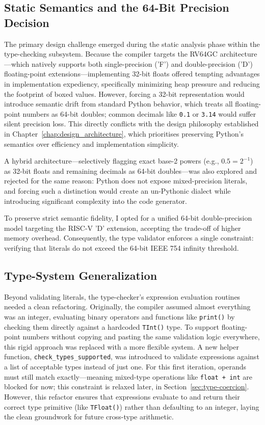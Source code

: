 \subsection{Static Semantics and the 64-Bit Precision Decision}
The primary design challenge emerged during the static analysis phase within the type-checking subsystem. Because the compiler targets the RV64GC architecture—which natively supports both single-precision ('F') and double-precision ('D') floating-point extensions—implementing 32-bit floats offered tempting advantages in implementation expediency, specifically minimizing heap pressure and reducing the footprint of boxed values. However, forcing a 32-bit representation would introduce semantic drift from standard Python behavior, which treats all floating-point numbers as 64-bit doubles; common decimals like \texttt{0.1} or \texttt{3.14} would suffer silent precision loss. This directly conflicts with the design philosophy established in Chapter~\ref{chap:design_architecture}, which prioritises preserving Python's semantics over efficiency and implementation simplicity.

A hybrid architecture—selectively flagging exact base-2 powers (e.g., $0.5 = 2^{-1}$) as 32-bit floats and remaining decimals as 64-bit doubles—was also explored and rejected for the same reason: Python does not expose mixed-precision literals, and forcing such a distinction would create an un-Pythonic dialect while introducing significant complexity into the code generator.

To preserve strict semantic fidelity, I opted for a unified 64-bit double-precision model targeting the RISC-V 'D' extension, accepting the trade-off of higher memory overhead. Consequently, the type validator enforces a single constraint: verifying that literals do not exceed the 64-bit IEEE 754 infinity threshold.

\subsection{Type-System Generalization}
Beyond validating literals, the type-checker's expression evaluation routines needed a clean refactoring. Originally, the compiler assumed almost everything was an integer, evaluating binary operators and functions like \texttt{print()} by checking them directly against a hardcoded \texttt{TInt()} type.
To support floating-point numbers without copying and pasting the same validation logic everywhere, this rigid approach was replaced with a more flexible system. A new helper function, \texttt{check\_types\_supported}, was introduced to validate expressions against a list of acceptable types instead of just one. For this first iteration, operands must still match exactly—meaning mixed-type operations like \texttt{float + int} are blocked for now; this constraint is relaxed later, in Section~\ref{sec:type-coercion}. However, this refactor ensures that expressions evaluate to and return their correct type primitive (like \texttt{TFloat()}) rather than defaulting to an integer, laying the clean groundwork for future cross-type arithmetic.

